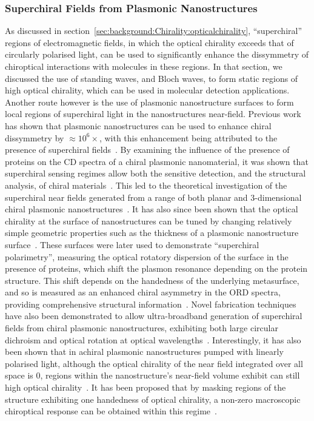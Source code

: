 \subsubsection{Superchiral Fields from Plasmonic Nanostructures} \label{sec:background:Plasmonics:superchiral}
As discussed in section~\ref{sec:background:Chirality:opticalchirality}, ``superchiral'' regions of electromagnetic fields, in which the optical chirality exceeds that of circularly polarised light, can be used to significantly enhance the dissymmetry of chiroptical interactions with molecules in these regions. In that section, we discussed the use of standing waves, and Bloch waves, to form static regions of high optical chirality, which can be used in molecular detection applications. 
Another route however is the use of plasmonic nanostructure surfaces to form local regions of superchiral light in the nanostructures near-field. Previous work has shown that plasmonic nanostructures can be used to enhance chiral dissymmetry by $\approx 10^6 \times$, with this enhancement being attributed to the presence of superchiral fields~\cite{Hendry2010}. By examining the influence of the presence of proteins on the CD spectra of a chiral plasmonic nanomaterial, it was shown that superchiral sensing regimes allow both the sensitive detection, and the structural analysis, of chiral materials~\cite{Hendry2010}. This led to the theoretical investigation of the superchiral near fields generated from a range of both planar and 3-dimensional chiral plasmonic nanostructures~\cite{Schaferling2012}. 
It has also since been shown that the optical chirality at the surface of nanostructures can be tuned by changing relatively simple geometric properties such as the thickness of a plasmonic nanostructure surface~\cite{Karimullah2015}. These surfaces were later used to demonstrate ``superchiral polarimetry'', measuring the optical rotatory dispersion of the surface in the presence of proteins, which shift the plasmon resonance depending on the protein structure. This shift depends on the handedness of the underlying metasurface, and so is measured as an enhanced chiral asymmetry in the ORD spectra, providing comprehensive structural information~\cite{Tullius2015}. 
Novel fabrication techniques have also been demonstrated to allow ultra-broadband generation of superchiral fields from chiral plasmonic nanostructures, exhibiting both large circular dichroism and optical rotation at optical wavelengths~\cite{Hou2016}. 
Interestingly, it has also been shown that in achiral plasmonic nanostructures pumped with linearly polarised light, although the optical chirality of the near field integrated over all space is $0$, regions within the nanostructure's near-field volume exhibit can still high optical chirality~\cite{Schaferling2012a, Davis2013}. It has been proposed that by masking regions of the structure exhibiting one handedness of optical chirality, a non-zero macroscopic chiroptical response can be obtained within this regime~\cite{Schaferling2012a}. 

